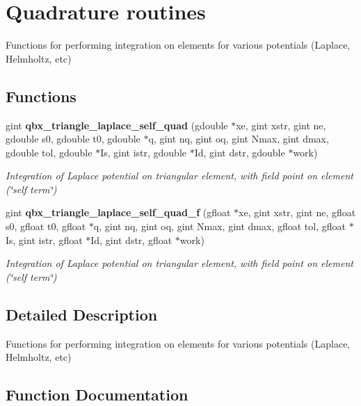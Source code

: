 \section{Quadrature routines}
\label{group__quadrature}


Functions for performing integration on elements for various potentials (Laplace, Helmholtz, etc)  


\subsection*{Functions}
\begin{DoxyCompactItemize}
\item 
gint {\bf qbx\+\_\+triangle\+\_\+laplace\+\_\+self\+\_\+quad} (gdouble $\ast$xe, gint xstr, gint ne, gdouble s0, gdouble t0, gdouble $\ast$q, gint nq, gint oq, gint Nmax, gint dmax, gdouble tol, gdouble $\ast$Is, gint istr, gdouble $\ast$Id, gint dstr, gdouble $\ast$work)
\begin{DoxyCompactList}\small\item\em Integration of Laplace potential on triangular element, with field point on element (\char`\"{}self term\char`\"{}) \end{DoxyCompactList}\item 
gint {\bf qbx\+\_\+triangle\+\_\+laplace\+\_\+self\+\_\+quad\+\_\+f} (gfloat $\ast$xe, gint xstr, gint ne, gfloat s0, gfloat t0, gfloat $\ast$q, gint nq, gint oq, gint Nmax, gint dmax, gfloat tol, gfloat $\ast$Is, gint istr, gfloat $\ast$Id, gint dstr, gfloat $\ast$work)
\begin{DoxyCompactList}\small\item\em Integration of Laplace potential on triangular element, with field point on element (\char`\"{}self term\char`\"{}) \end{DoxyCompactList}\end{DoxyCompactItemize}


\subsection{Detailed Description}
Functions for performing integration on elements for various potentials (Laplace, Helmholtz, etc) 



\subsection{Function Documentation}
